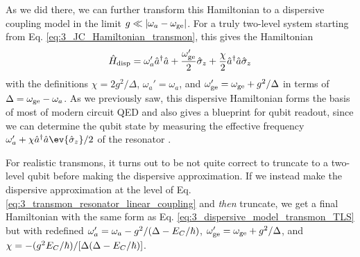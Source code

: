 As we did there, we can further transform this Hamiltonian to a dispersive coupling model in the limit $g \ll |\omega_a - \omega_{\rm ge}|$. For a truly two-level system starting from Eq. \eqref{eq:3_JC_Hamiltonian_transmon}, this gives the Hamiltonian
\begin{equation}
    \hat{H}_{\rm disp} = \omega_a' \hat{a}^\dagger\hat{a} + \frac{\omega_{\rm ge}'}{2}\hat{\sigma}_z + \frac{\chi}{2}\hat{a}^\dagger\hat{a}\hat{\sigma}_z
    \label{eq:3_dispersive_model_transmon_TLS}
\end{equation}
with the definitions $\chi = 2g^2/\Delta$, $\omega_a' = \omega_a$, and $\omega_{\rm ge}' = \omega_{\rm ge} + g^2/\Delta$ in terms of $\Delta = \omega_{\rm ge} - \omega_a$. As we previously saw, this dispersive Hamiltonian forms the basis of most of modern circuit QED and also gives a blueprint for qubit readout, since we can determine the qubit state by measuring the effective frequency $\omega_a' + \chi \hat{a}^\dagger\hat{a}\ev{\sigmaz}/2$ of the resonator \cite{blais2004cavity}. 

For realistic transmons, it turns out to be not quite correct to truncate to a two-level qubit before making the dispersive approximation. If we instead make the dispersive approximation at the level of Eq. \eqref{eq:3_transmon_resonator_linear_coupling} and \textit{then} truncate, we get a final Hamiltonian with the same form as Eq. \eqref{eq:3_dispersive_model_transmon_TLS} but with redefined $\omega_a' = \omega_a - g^2/(\Delta - E_C/\hbar)$, $\omega_{\rm ge}' = \omega_{\rm ge} + g^2/\Delta$, and $\chi = - (g^2E_C/\hbar) / [\Delta(\Delta - E_C/\hbar)]$. 

